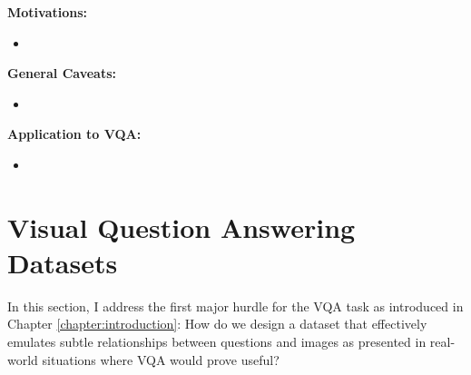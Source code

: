 \textbf{Motivations:}

\begin{itemize}
    \item 
\end{itemize}

\textbf{General Caveats:}

\begin{itemize}
    \item 
\end{itemize}

\textbf{Application to VQA:}
\begin{itemize}
    \item 
\end{itemize}


\section{Visual Question Answering Datasets}
\label{section:vqa_datasets}

In this section, I address the first major hurdle for the VQA task as introduced in Chapter \ref{chapter:introduction}: How do we design a dataset that effectively emulates subtle relationships between questions and images as presented in real-world situations where VQA would prove useful?




